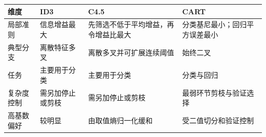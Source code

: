 \begin{comparisonbox}
\par\medskip
\small
\begin{tabularx}{\linewidth}{@{}>{\raggedright\arraybackslash}p{1.65cm} >{\raggedright\arraybackslash}X >{\raggedright\arraybackslash}X >{\raggedright\arraybackslash}X@{}}
\toprule 维度 & ID3 & C4.5 & CART\\ \midrule
局部准则 & 信息增益最大 & 先筛选不低于平均增益，再令增益比最大 & 分类基尼最小；回归平方误差最小\\
典型分支 & 离散特征多叉 & 离散多叉并可扩展连续阈值 & 始终二叉\\
任务 & 主要用于分类 & 主要用于分类 & 分类与回归\\
复杂度控制 & 需另加停止或剪枝 & 需另加停止或剪枝 & 最弱环节剪枝与验证选择\\
高基数偏好 & 较明显 & 由取值熵归一化缓和 & 受二值切分和验证控制\\
\bottomrule
\end{tabularx}
\end{comparisonbox}

